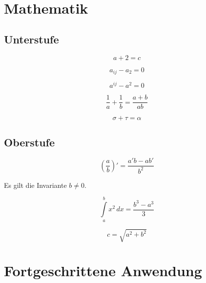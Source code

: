 \documentclass[11pt]{scrartcl}
\begin{document}
\section{Mathematik}
\label{sec:mathematik}
 
\subsection{Unterstufe}
\label{sec:unterstufe}

\begin{equation*}
  a + 2 = c
\end{equation*}

\begin{equation*}
  a_{ij} - a_2 = 0
\end{equation*}

\begin{equation*}
  a^{ij} - a^2 = 0
\end{equation*}

\begin{equation*}
  \frac{1}{a} + \frac{1}{b} = \frac{a+b}{ab}
\end{equation*}

\begin{equation*}
  \sigma + \tau = \alpha
\end{equation*}
 
\subsection{Oberstufe} 
\label{sec:oberstufe}

\begin{equation}
  \label{eq:1}
  \left( \frac{a}{b} \right)' = \frac{a'b-ab'}{b^{2}}
\end{equation}

Es gilt die Invariante $b \neq 0$.

\begin{equation}
  \label{eq:2}
  \int\limits_{a}^{b} x^{2} \, dx = \frac{ b^{3} - a^{3} }{3}
\end{equation}

\begin{equation}
  \label{eq:3}
  c = \sqrt{ a^{2} + b^{2} }
\end{equation}



\section{Fortgeschrittene Anwendung}
\label{sec:fortg-anwend}
 
\end{document}
